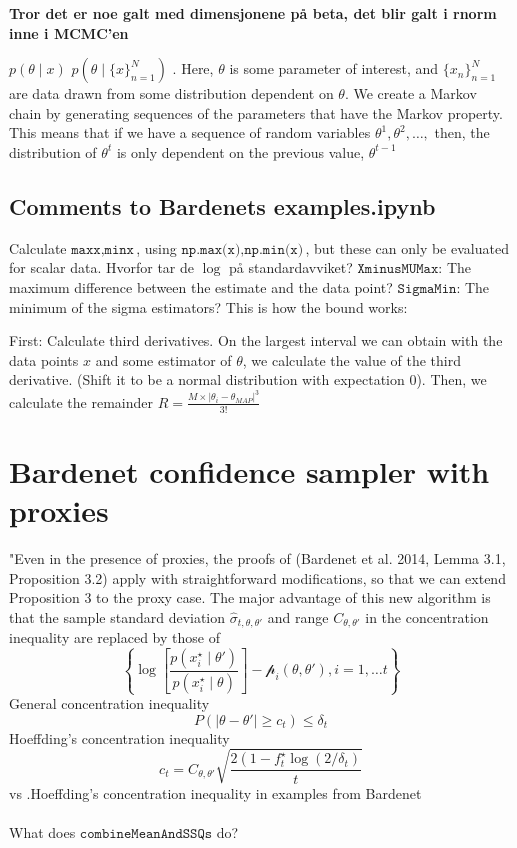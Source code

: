 \documentclass{article}
\begin{document}
\textbf{Tror det er noe galt med dimensjonene på beta, det blir galt i rnorm inne i MCMC'en}


$p\left(\theta\mid x\right)$  $p(\theta\mid \{x\}_{n=1}^N)$
\cite{BDA3}. Here, $\theta$ is some parameter of interest, and $\{x_n\}_{n=1}^N$ are data drawn from some distribution dependent on $\theta$. We create a Markov chain by generating sequences of the parameters that have the Markov property. This means that if we have a sequence of random variables $\theta^1, \theta^2, \ldots,$ then, the distribution of $\theta^t$ is only dependent on the previous value, $\theta^{t-1}$ 



\subsection{Comments to Bardenets examples.ipynb}
Calculate $\texttt{maxx}, \texttt{minx}$, using $\texttt{np.max(x)}, \texttt{np.min(x)}$, but these can only be evaluated for scalar data.
Hvorfor tar de $\log$ på standardavviket? 
$\texttt{XminusMUMax}$: The maximum difference between the estimate and the data point? $\texttt{SigmaMin}$: The minimum of the sigma estimators?
This is how the bound works: 

First: Calculate third derivatives. On the largest interval we can obtain with the data points $x$ and some estimator of $\theta$, we calculate the value of the third derivative. (Shift it to be a normal distribution with expectation 0). Then, we calculate the remainder $R = \frac{M\times|\theta_i-\theta_{MAP}|^3}{3!}$

\section{Bardenet confidence sampler with proxies}
"Even in the presence of proxies, the proofs of (Bardenet et al. 2014, Lemma 3.1, Proposition 3.2) apply with straightforward modifications, so that we can extend Proposition 3 to the proxy case. The major advantage of this new algorithm is that the sample standard deviation $\hat{\sigma}_{t, \theta, \theta'}$ and range $C_{\theta, \theta'}$ in the concentration inequality are replaced by those of 
$$\left\{\log\left[\frac{p\left(x_i^{\star}\mid \theta'\right)}{p\left(x_i^{\star}\mid \theta\right)}\right] - \mathscr{p}_i\left(\theta, \theta'\right), i = 1, \ldots t\right\}$$
General concentration inequality 
\begin{equation}
P\left(\mid \theta - \theta'\mid \geq c_t \right) \leq \delta_t   
\end{equation}{}
Hoeffding's concentration inequality 
\begin{equation*}
    c_t = C_{\theta, \theta'} \sqrt{\frac{2\left(1-f_t^{\star}\log\left(2/\delta_t\right)}{t}}
\end{equation*}
vs .Hoeffding's concentration inequality in examples from Bardenet
\\ \\ 
What does $\texttt{combineMeanAndSSQs}$ do?
\end{document}

